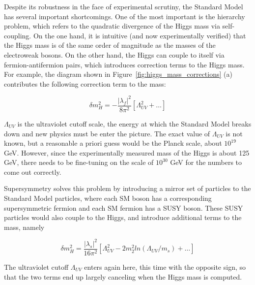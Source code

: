Despite its robustness in the face of experimental scrutiny, the Standard Model has several important shortcomings.  One of the most important is the hierarchy problem, which refers to the quadratic divergence of the Higgs mass via self-coupling.  On the one hand, it is intuitive (and now experimentally verified) that the Higgs mass is of the same order of magnitude as the masses of the electroweak bosons.  On the other hand, the Higgs can couple to itself via fermion-antifermion pairs, which introduces correction terms to the Higgs mass.  For example, the diagram shown in Figure~\ref{fig:higgs_mass_corrections} (a) contributes the following correction term to the mass:

\begin{equation}
	\delta m_H^2 = -\frac{|\lambda_f |^2}{8\pi^2}[\Lambda_{UV}^2+\ldots]
\end{equation}

$\Lambda_{UV}$ is the ultraviolet cutoff scale, the energy at which the Standard Model breaks down and new physics must be enter the picture.  The exact value of $\Lambda_{UV}$ is not known, but a reasonable a priori guess would be the Planck scale, about $10^{19}$ GeV.  However, since the experimentally measured mass of the Higgs is about 125 GeV, there needs to be fine-tuning on the scale of $10^{30}$ GeV for the numbers to come out correctly.

Supersymmetry solves this problem by introducing a mirror set of particles to the Standard Model particles, where each SM boson has a corresponding supersymmetric fermion and each SM fermion has a SUSY boson.  These SUSY particles would also couple to the Higgs, and introduce additional terms to the mass, namely

\begin{equation}
	\delta m_H^2 = \frac{|\lambda_s |^2}{16\pi^2}[\Lambda_{UV}^2-2m_2^2ln(\Lambda_{UV}/m_s)+\ldots]
\end{equation}

The ultraviolet cutoff $\Lambda_{UV}$ enters again here, this time with the opposite sign, so that the two terms end up largely canceling when the Higgs mass is computed.  

